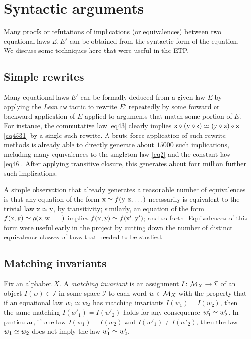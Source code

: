 
\section{Syntactic arguments}\label{syntactic-sec}

Many proofs or refutations of implications (or equivalences) between two equational laws $E,E'$ can be obtained from the syntactic form of the equation.  We discuss some techniques here that were useful in the ETP.

\subsection{Simple rewrites}\label{rewrite-sec}

Many equational laws $E'$ can be formally deduced from a given law $E$ by applying the \emph{Lean} \texttt{rw} tactic to rewrite $E'$ repeatedly by some forward or backward application of $E$ applied to arguments that match some portion of $E$.  For instance, the commutative law \eqref{eq43} clearly implies $\mathrm{x} \diamond (\mathrm{y} \diamond \mathrm{z}) \simeq (\mathrm{y} \diamond \mathrm{z}) \diamond \mathrm{x}$ \eqref{eq4531}
by a single such rewrite.  A brute force application of such rewrite methods is already able to directly generate about $\num{15000}$ such implications, including many equivalences to the singleton law \eqref{eq2} and the constant law \eqref{eq46}.  After applying transitive closure, this generates about four million further such implications.

A simple observation that already generates a reasonable number of equivalences is that any equation of the form $\mathrm{x} \simeq f(\mathrm{y},\mathrm{z},\dots)$ necessarily is equivalent to the trivial law $\mathrm{x} \simeq \mathrm{y}$, by transitivity; similarly, an equation of the form $f(\mathrm{x},\mathrm{y}) \simeq g(\mathrm{z},\mathrm{w},\dots)$ implies $f(\mathrm{x},\mathrm{y}) \simeq f(\mathrm{x}',\mathrm{y}')$; and so forth.  Equivalences of this form were useful early in the project by cutting down the number of distinct equivalence classes of laws that needed to be studied.

\subsection{Matching invariants}

Fix an alphabet $X$. A \emph{matching invariant} is an assignment $I \colon {\mathcal{M}}_X \to {\mathcal I}$ of an object $I(w) \in {\mathcal I}$ in some space ${\mathcal I}$ to each word $w \in {\mathcal{M}}_X$ with the property that if an equational law $w_1 \simeq w_2$ has matching invariants $I(w_1)=I(w_2)$, then the same matching $I(w'_1) = I(w'_2)$ holds for any consequence $w'_1 \simeq w'_2$.  In particular, if one law $I(w_1)=I(w_2)$ and $I(w'_1) \neq I(w'_2)$, then the law $w_1 \simeq w_2$ does not imply the law $w'_1 \simeq w'_2$.

